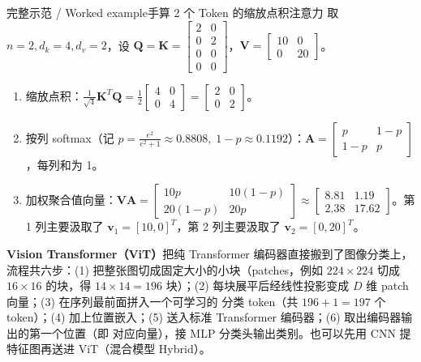 \begin{StudyBlock}{完整示范 / Worked example}{手算 2 个 Token 的缩放点积注意力}
取 $n=2, d_k=4, d_v=2$，设 $\mathbf{Q}=\mathbf{K}=\begin{bmatrix}2&0\\0&2\\0&0\\0&0\end{bmatrix}$，$\mathbf{V}=\begin{bmatrix}10&0\\0&20\end{bmatrix}$。
\begin{enumerate}
\item 缩放点积：$\frac{1}{\sqrt{4}}\mathbf{K}^T\mathbf{Q} = \frac{1}{2}\begin{bmatrix}4&0\\0&4\end{bmatrix} = \begin{bmatrix}2&0\\0&2\end{bmatrix}$。
\item 按列 softmax（记 $p=\frac{e^2}{e^2+1}\approx 0.8808,\; 1-p\approx 0.1192$）：$\mathbf{A}=\begin{bmatrix}p & 1-p\\ 1-p & p\end{bmatrix}$，每列和为 1。
\item 加权聚合值向量：$\mathbf{V}\mathbf{A} = \begin{bmatrix}10p & 10(1-p)\\ 20(1-p) & 20p\end{bmatrix} \approx \begin{bmatrix}8.81 & 1.19\\ 2.38 & 17.62\end{bmatrix}$。第 1 列主要汲取了 $\mathbf{v}_1=[10,0]^T$，第 2 列主要汲取了 $\mathbf{v}_2=[0,20]^T$。
\end{enumerate}
\end{StudyBlock}


\textbf{Vision Transformer（ViT）}把纯 Transformer 编码器直接搬到了图像分类上，流程共六步：(1) 把整张图切成固定大小的小块（patches，例如 $224\times 224$ 切成 $16\times 16$ 的块，得 $14\times 14=196$ 块）；(2) 每块展平后经线性投影变成 $D$ 维 patch 向量；(3) 在序列最前面拼入一个可学习的 \StudyInline{[class]} 分类 token（共 $196+1=197$ 个 token）；(4) 加上位置嵌入；(5) 送入标准 Transformer 编码器；(6) 取出编码器输出的第一个位置（即 \StudyInline{[class]} 对应向量），接 MLP 分类头输出类别。也可以先用 CNN 提特征图再送进 ViT（混合模型 Hybrid）。

